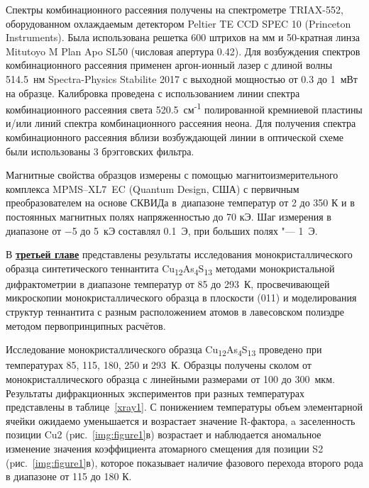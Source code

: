 Спектры комбинационного рассеяния получены на спектрометре TRIAX-552, оборудованном охлаждаемым детектором Peltier TE CCD SPEC 10 (Princeton Instruments).
Была использована решетка 600 штрихов на мм и 50-кратная линза Mitutoyo M Plan Apo SL50 (числовая апертура 0.42).
Для возбуждения спектров комбинационного рассеяния применен аргон-ионный лазер с длиной волны 514.5~нм Spectra-Physics Stabilite 2017 с выходной мощностью от 0.3 до 1~мВт на образце. Калибровка проведена с использованием линии спектра комбинационного рассеяния света 520.5~см\textsuperscript{-1} полированной кремниевой пластины и/или линий спектра комбинационного рассеяния неона.
Для получения спектра комбинационного рассеяния вблизи возбуждающей линии в оптической схеме были использованы 3  брэгговских фильтра.

Магнитные свойства образцов измерены с
помощью магнитоизмерительного комплекса
MPMS--XL7~EC (Quantum Design, США) с первичным преобразователем на основе СКВИДа в~диапазоне температур от 2 до 350 К и в постоянных магнитных полях напряженностью до 70 кЭ. Шаг измерения в диапазоне от $-$5 до 5~кЭ составлял 0.1~Э, при больших полях "--- 1~Э.

В \underline{\textbf{третьей главе}} представлены результаты исследования монокристаллического образца синтетического теннантита Cu\textsubscript{12}As\textsubscript{4}S\textsubscript{13} методами монокристальной дифрактометрии в диапазоне температур от 85 до 293~К, просвечивающей микроскопии монокристаллического образца в плоскости (011) и моделирования структур теннантита с разным расположением атомов в лавесовском полиэдре методом первопринципных расчётов.



Исследование монокристаллического образца  Cu\textsubscript{12}As\textsubscript{4}S\textsubscript{13} проведено при температурах 85, 115, 180, 250 и 293~К. Образцы получены сколом от монокристаллического образца с линейными размерами от 100 до 300~мкм.  Результаты дифракционных экспериментов при разных температурах представлены в таблице~\ref{xray1}. С понижением температуры объем элементарной ячейки ожидаемо уменьшается и возрастает значение R-фактора, a  заселенность позиции Cu2 (pис.~\ref{img:figure1}в) возрастает и  наблюдается аномальное изменение значения коэффициента атомарного смещения для позиции S2 (pис.~\ref{img:figure1}в), которое показывает наличие фазового перехода второго рода в диапазоне от 115 до 180 К.



